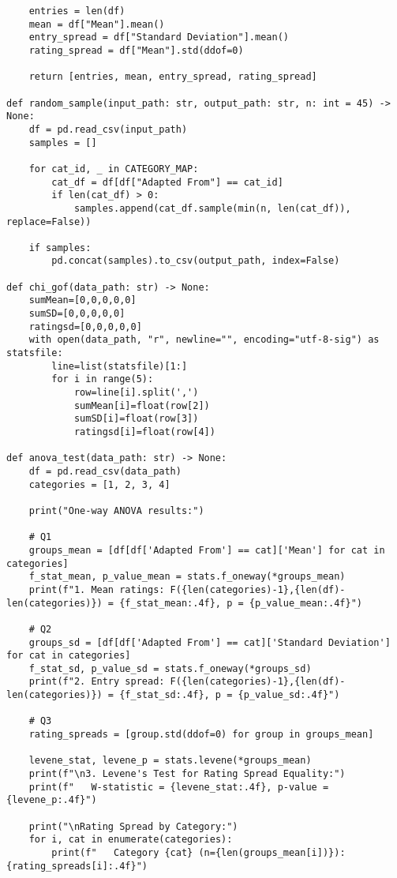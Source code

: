 \documentclass{article}
\begin{document}
\begin{CJK*}{UTF8}{gbsn}
\begin{CJK*}{UTF8}{gbsn}
\begin{verbatim}
    entries = len(df)
    mean = df["Mean"].mean()
    entry_spread = df["Standard Deviation"].mean()
    rating_spread = df["Mean"].std(ddof=0)
    
    return [entries, mean, entry_spread, rating_spread]

def random_sample(input_path: str, output_path: str, n: int = 45) -> None:
    df = pd.read_csv(input_path)
    samples = []
    
    for cat_id, _ in CATEGORY_MAP:
        cat_df = df[df["Adapted From"] == cat_id]
        if len(cat_df) > 0:
            samples.append(cat_df.sample(min(n, len(cat_df)), replace=False))
    
    if samples:
        pd.concat(samples).to_csv(output_path, index=False)

def chi_gof(data_path: str) -> None:
    sumMean=[0,0,0,0,0]
    sumSD=[0,0,0,0,0]
    ratingsd=[0,0,0,0,0]
    with open(data_path, "r", newline="", encoding="utf-8-sig") as statsfile:
        line=list(statsfile)[1:]
        for i in range(5):
            row=line[i].split(',')
            sumMean[i]=float(row[2])
            sumSD[i]=float(row[3])
            ratingsd[i]=float(row[4])

def anova_test(data_path: str) -> None:
    df = pd.read_csv(data_path)
    categories = [1, 2, 3, 4]
    
    print("One-way ANOVA results:")
    
    # Q1
    groups_mean = [df[df['Adapted From'] == cat]['Mean'] for cat in categories]
    f_stat_mean, p_value_mean = stats.f_oneway(*groups_mean)
    print(f"1. Mean ratings: F({len(categories)-1},{len(df)-len(categories)}) = {f_stat_mean:.4f}, p = {p_value_mean:.4f}")
    
    # Q2
    groups_sd = [df[df['Adapted From'] == cat]['Standard Deviation'] for cat in categories]
    f_stat_sd, p_value_sd = stats.f_oneway(*groups_sd)
    print(f"2. Entry spread: F({len(categories)-1},{len(df)-len(categories)}) = {f_stat_sd:.4f}, p = {p_value_sd:.4f}")
    
    # Q3
    rating_spreads = [group.std(ddof=0) for group in groups_mean]
    
    levene_stat, levene_p = stats.levene(*groups_mean)
    print(f"\n3. Levene's Test for Rating Spread Equality:")
    print(f"   W-statistic = {levene_stat:.4f}, p-value = {levene_p:.4f}")
    
    print("\nRating Spread by Category:")
    for i, cat in enumerate(categories):
        print(f"   Category {cat} (n={len(groups_mean[i])}): {rating_spreads[i]:.4f}")
        

\end{verbatim}
\end{CJK*}
\end{CJK*}
\end{document}
